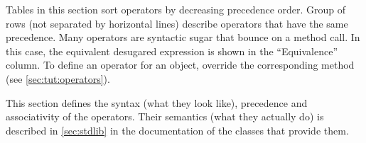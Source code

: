 Tables in this section sort operators by decreasing precedence order.  Group
of rows (not separated by horizontal lines) describe operators that have the
same precedence. Many operators are syntactic sugar that bounce on a method
call. In this case, the equivalent desugared expression is shown in the
``Equivalence'' column.  To define an operator for an object, override the
corresponding method (see \autoref{sec:tut:operators}).

This section defines the syntax (what they look like), precedence and
associativity of the operators. Their semantics (what they actually do) is
described in \autoref{sec:stdlib} in the documentation of the classes that
provide them.


\newcommand{\operator}[6][]{%
  \lstinline@#2@ & \lstinline@#3@ & #4 & #5 & \lstinline@#6@#1%
}

\newcommand{\boperator}[3]{%
  \operator{#1}{a #1 b}{#2}{#3}{a.'#1'(b)}%
}

\newcommand{\poperator}[3]{%
  \operator{#1}{#1a}{#2}{#3}{a.'#1'()}%
}

\newcommand{\operatorin}     {\operator  {in}     {a in b}       {None}     {Membership}            {b.has(a)}          }
\newcommand{\operatornotin}  {\operator  {not in} {a not in b}   {None}     {Non-membership}        {b.hasNot(a)}      }
\newcommand{\operatorsub}    {\operator  {[]}   {a[args]}        {Left}     {Subscript}             {a.'[]'(args)}          }
\newcommand{\operatorsubass} {\operator  {[] =} {a[args] = v}    {Right}     {Subscript assignment}  {a.'[]='(args, v)}      }

\newcommand{\operatorprop}   {\operator  {->}   {a->b}             {Left}     {Property access}        {getProperty("a", "b")} }
\newcommand{\operatorpropass}{\operator  {->}   {a->b = v}         {Right}     {Property assignment}    {setProperty("a", "b", v)}}
\newcommand{\operatordot}    {\operator  {.}    {a.b}              {Left}     {Message sending}        {Not redefinable}       }
\newcommand{\operatordota}   {\operator  {.}    {a.b(args)}        {Left}     {Message sending}        {Not redefinable}       }
\newcommand{\operatordotand} {\operator  {.\&}   {a.\&b}             {Left}     {Slot access}            {a.getSlot("b")}        }
\newcommand{\operatoruand} {\operator  {\&}   {\&a}             {-}     {Slot access}            {getSlot("a")}        }
\newcommand{\operatorass}[1][]{\operator[#1]
                                         {=}    {a = b}            {Right} {Assignment}             {updateSlot("a", b)}    }

